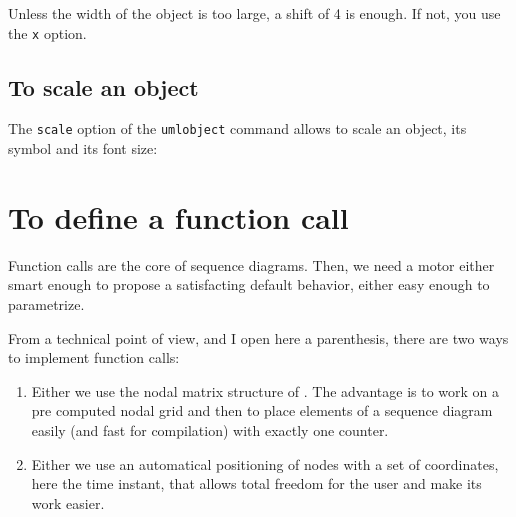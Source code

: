 \documentclass[a4paper,11pt]{report}
\begin{document}
Unless the width of the object is too large, a shift of 4 is enough. If not, you use the {\tt x} option.

\subsection{To scale an object}\label{ss.objdim}

The {\tt scale} option of the {\tt umlobject} command allows to scale an object, its symbol and its font size:

\medskip

\begin{minipage}{0.5\textwidth}

\end{minipage}
\begin{minipage}{0.5\textwidth}
\begin{center}
\end{center}
\end{minipage}

\begin{minipage}{0.5\textwidth}

\end{minipage}
\begin{minipage}{0.5\textwidth}
\begin{center}
\end{center}
\end{minipage}

\section{To define a function call}\label{s.calls}

Function calls are the core of sequence diagrams. Then, we need a motor either smart enough to propose a satisfacting default behavior, either easy enough to parametrize.

From a technical point of view, and I open here a parenthesis, there are two ways to implement function calls:

\begin{enumerate}
\item Either we use the nodal matrix structure of \TikZ. The advantage is to work on a pre computed nodal grid and then to place elements of a sequence diagram easily (and fast for compilation) with exactly one counter.
\item Either we use an automatical positioning of nodes with a set of coordinates, here the time instant, that allows total freedom for the user and make its work easier.
\end{enumerate}
\end{document}
